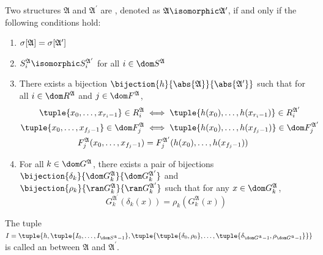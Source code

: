 \begin{dfn}[Isomorphism]
    \label{dfn:isomorphism}
    Two structures \( \mathfrak{A} \) and \( \mathfrak{A}^{\prime} \) are , denoted as
    \( \mathfrak{A} \isomorphic \mathfrak{A^\prime} \),
    if and only if the following conditions hold:
    \begin{enumerate}[topsep=2pt,noitemsep,label=\textup{\texttt{(\alph*)}}]
        \item \( \sigma \mleft[ \mathfrak{A} \mright] = \sigma \mleft[ \mathfrak{A^{\prime}} \mright] \)
        \item \( S^{\mathfrak{A}}_{i} \isomorphic S^{\mathfrak{A}^{\prime}}_{i} \) for all \( i \in \dom S^{\mathfrak{A}} \)
        \item There exists a bijection \( \bijection{h}{\abs{\mathfrak{A}}}{\abs{\mathfrak{A^{\prime}}}} \) such that
            for all \( i \in \dom R^{\mathfrak{A}} \) and \( j \in \dom F^{\mathfrak{A}} \),
            \begin{align*}
                \tuple{x_{0}, \dots, x_{r_{i}-1}} \in R^{\mathfrak{A}}_{i} &\iff \tuple{h(x_{0}), \dots, h(x_{r_{i} - 1})} \in R^{\mathfrak{A^{\prime}}}_{i}\\
                \tuple{x_{0},\dots,x_{f_{j}-1}} \in \dom F^{\mathfrak{A}}_{j} &\iff \tuple{h(x_{0}),\dots,h(x_{f_{j}-1})} \in \dom F^{\mathfrak{A^{\prime}}}_{j}\\
                F^{\mathfrak{A}}_{j}(x_{0},\dots,x_{f_{j} - 1}) &= F^{\mathfrak{A}^{\prime}}_{j}(h(x_{0}),\dots,h(x_{f_{j} - 1}))
            \end{align*}
        \item For all \( k \in \dom G^{\mathfrak{A}} \), there exists a pair of bijections
            \( \bijection{\delta_{k}}{\dom G^{\mathfrak{A}}_{k}}{\dom G^{\mathfrak{A}^{\prime}}_{k}} \) and
            \( \bijection{\rho_{k}}{\ran G^{\mathfrak{A}}_{k}}{\ran G^{\mathfrak{A}^{\prime}}_{k}} \) such that
            for any \( x \in \dom G^{\mathfrak{A}}_{k} \),
            \begin{equation*}
                G^{\mathfrak{A}^{\prime}}_{k}(\delta_{k}(x)) = \rho_{k}(G^{\mathfrak{A}}_{k}(x))
            \end{equation*}
    \end{enumerate}
    The tuple \( I = \tuple{h,
                        \tuple{I_{0}, \dots, I_{\dom S^{\mathfrak{A}} - 1}},
                        \tuple{ \tuple{\delta_{0}, \rho_{0}}, \dots, \tuple{ \delta_{\dom G^{\mathfrak{A}} - 1}, \rho_{\dom G^{\mathfrak{A}} - 1}}}
              }\)
    is called an  between \( \mathfrak{A} \) and \( \mathfrak{A}^{\prime} \).
\end{dfn}

